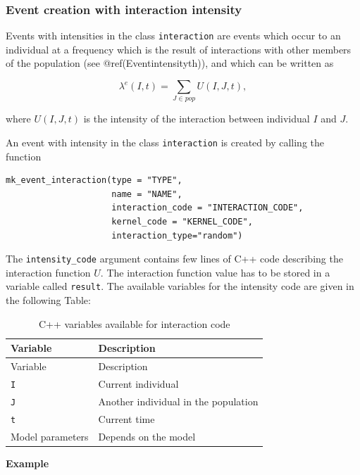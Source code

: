 \hypertarget{event-creation-with-interaction-intensity}{%
\subsubsection{Event creation with interaction intensity}\label{event-creation-with-interaction-intensity}}

Events with intensities in the class \texttt{interaction} are events which occur to an individual at a frequency which is the result of interactions with other members of the population (see @ref(Eventintensityth)), and which can be written as

\begin{equation*}
\lambda^e(I,t) = \sum_{J \in pop} U(I,J,t),
\end{equation*}

where \(U(I,J,t)\) is the intensity of the interaction between individual \(I\) and \(J\).

An event with intensity in the class \texttt{interaction} is created by calling the function

\begin{verbatim}
mk_event_interaction(type = "TYPE",
                     name = "NAME",
                     interaction_code = "INTERACTION_CODE",
                     kernel_code = "KERNEL_CODE",
                     interaction_type="random")
\end{verbatim}

The \texttt{intensity\_code} argument contains few lines of C++ code describing
the interaction function \(U\). The interaction function value has to be stored in a variable called \texttt{result}. The available variables for the intensity code are given in the following Table:

\begin{longtable}[]{@{}ll@{}}
\caption{C++ variables available for interaction code}\tabularnewline
\toprule
Variable & Description\tabularnewline
\midrule
\endfirsthead
\toprule
Variable & Description\tabularnewline
\midrule
\endhead
\texttt{I} & Current individual\tabularnewline
\texttt{J} & Another individual in the population\tabularnewline
\texttt{t} & Current time\tabularnewline
Model parameters & Depends on the model\tabularnewline
\bottomrule
\end{longtable}

\textbf{Example}

\begin{Shaded}
\begin{Highlighting}[]
\end{Highlighting}
\end{Shaded}

